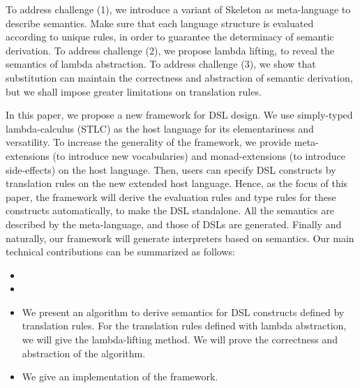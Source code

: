 To address challenge (1),
we introduce a variant of Skeleton \cite{skeleton} as meta-language to describe semantics.
Make sure that each language structure is evaluated according to unique rules,
in order to guarantee the determinacy of semantic derivation.
To address challenge (2),
we propose lambda lifting, to reveal the semantics of lambda abstraction.
To address challenge (3),
we show that substitution can maintain the correctness and abstraction of semantic derivation,
but we shall impose greater limitations on translation rules.

In this paper, we propose a new framework for DSL design.
We use simply-typed lambda-calculus (STLC) as the host language for its elementariness and versatility.
To increase the generality of the framework,
we provide meta-extensions (to introduce new vocabularies) and monad-extensions (to introduce side-effects) on the host language.
Then, users can specify DSL constructs by translation rules on the new extended host language.
Hence, as the focus of this paper, the framework will derive the evaluation rules and type rules for these constructs automatically, to make the DSL standalone.
All the semantics are described by the meta-language, and those of DSLs are generated.
Finally and naturally, our framework will generate interpreters based on semantics.
Our main technical contributions can be summarized as follows:

\begin{itemize}
  \item {}
  \item {}
  \item We present an algorithm to derive semantics for DSL constructs defined by translation rules.
        For the translation rules defined with lambda abstraction,
        we will give the lambda-lifting method.
        We will prove the correctness and abstraction of the algorithm.
  \item We give an implementation of the framework.
\end{itemize}
